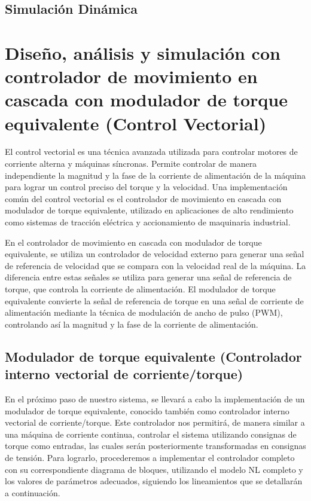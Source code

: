 \documentclass{article}
\begin{document}

\subsection{Simulación Dinámica}






\section{Diseño, análisis y simulación con controlador de movimiento en cascada con modulador de torque equivalente (Control Vectorial)}

El control vectorial es una técnica avanzada utilizada para controlar motores de corriente alterna y máquinas 
síncronas. Permite controlar de manera independiente la magnitud y la fase de la corriente de alimentación de la 
máquina para lograr un control preciso del torque y la velocidad. Una implementación común del control vectorial 
es el controlador de movimiento en cascada con modulador de torque equivalente, utilizado en aplicaciones de alto 
rendimiento como sistemas de tracción eléctrica y accionamiento de maquinaria industrial.

En el controlador de movimiento en cascada con modulador de torque equivalente, se utiliza un controlador de 
velocidad externo para generar una señal de referencia de velocidad que se compara con la velocidad real de la 
máquina. La diferencia entre estas señales se utiliza para generar una señal de referencia de torque, que controla 
la corriente de alimentación. El modulador de torque equivalente convierte la señal de referencia de torque en una
señal de corriente de alimentación mediante la técnica de modulación de ancho de pulso (PWM), controlando así la 
magnitud y la fase de la corriente de alimentación.


\subsection{Modulador de torque equivalente (Controlador interno vectorial de corriente/torque)}

En el próximo paso de nuestro sistema, se llevará a cabo la implementación de un modulador de torque equivalente, 
conocido también como controlador interno vectorial de corriente/torque. Este controlador nos permitirá, de manera
similar a una máquina de corriente continua, controlar el sistema utilizando consignas de torque como entradas, 
las cuales serán posteriormente transformadas en consignas de tensión. Para lograrlo, procederemos a implementar 
el controlador completo con su correspondiente diagrama de bloques, utilizando el modelo NL completo y los valores
de parámetros adecuados, siguiendo los lineamientos que se detallarán a continuación.
\end{document}
